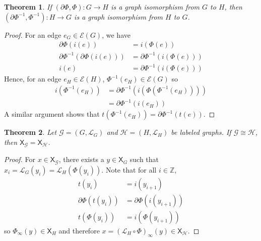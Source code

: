 \documentclass{article}
\newcommand{\Lc}{\mathcal{L}}  %
\newcommand{\Gc}{\mathcal{G}}  %
\newcommand{\Hc}{\mathcal{H}}  %
\newcommand{\Ec}{\mathcal{E}}
\newcommand{\shift}[1]{\mathsf{X}_{#1}}
\newtheorem{theorem}{Theorem}
\begin{document}
    \begin{theorem} 
        If \((\partial\Phi, \Phi) : G \to H\) is a graph isomorphism from \(G\) to \(H\),
        then \((\partial\Phi^{-1}, \Phi^{-1}): H \to G\) is a graph isomorphism from \(H\) to \(G\).
    \end{theorem}

    \begin{proof}
        For an edge \(e_G \in \Ec(G)\), we have 
        \begin{align*}
            \partial\Phi(i(e)) &= i(\Phi(e))  \\
            \partial\Phi^{-1}(\partial\Phi(i(e))) &= \partial\Phi^{-1}(i(\Phi(e)))\\
            i(e) &= \partial\Phi^{-1}(i(\Phi(e)))
        \end{align*}
        Hence, for an edge \(e_H \in \Ec(H)\), \(\Phi^{-1}(e_H) \in \Ec(G)\) so 
        \begin{align*}
            i(\Phi^{-1}(e_H)) &= \partial\Phi^{-1}(i(\Phi(\Phi^{-1}(e_H))))\\
            &= \partial\Phi^{-1}(i(e_H))
        \end{align*}
        A similar argument shows that \(t(\Phi^{-1}(e_H)) = \partial\Phi^{-1}(t(e))\).
        
    \end{proof}


    \begin{theorem}
        Let \(\Gc = (G, \Lc_G)\) and \(\Hc = (H, \Lc_H)\) be labeled graphs. 
        If \(\Gc \cong \Hc\), then \(\shift{\Gc} = \shift{\Hc}\).
    \end{theorem}

    \begin{proof}
        For \(x \in \shift{\Gc}\), there exists a \(y \in \shift{G}\) such that \(x_i = \Lc_G(y_i) = \Lc_H(\Phi(y_i))\).
        Note that for all \(i \in \mathbb{Z}\),
        \begin{align*}
            t(y_i) &= i(y_{i+1})\\
            \partial \Phi(t(y_i)) &= \partial\Phi(i(y_{i+1}))\\
            t(\Phi(y_i)) &= i(\Phi(y_{i+1}))
        \end{align*}
        so \(\Phi_\infty(y) \in \shift{H}\) and therefore \(x=\left( \Lc_H \circ \Phi \right)_\infty(y) \in \shift{\Hc}\).
        
    \end{proof}

    
\end{document}
